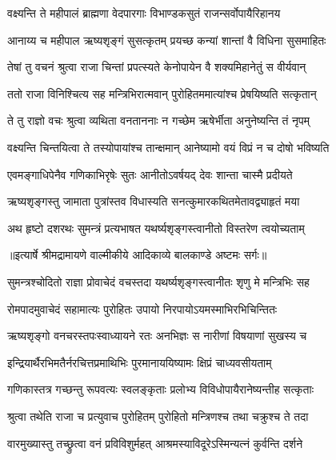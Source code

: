 \twolineshloka
{वक्ष्यन्ति ते महीपालं ब्राह्मणा वेदपारगाः}
{विभाण्डकसुतं राजन्सर्वोपायैरिहानय} %

\twolineshloka
{आनाय्य च महीपाल ऋष्यशृङ्गं सुसत्कृतम्}
{प्रयच्छ कन्यां शान्तां वै विधिना सुसमाहितः} %

\twolineshloka
{तेषां तु वचनं श्रुत्वा राजा चिन्तां प्रपत्स्यते}
{केनोपायेन वै शक्यमिहानेतुं स वीर्यवान्} %

\twolineshloka
{ततो राजा विनिश्चित्य सह मन्त्रिभिरात्मवान्}
{पुरोहितममात्यांश्च प्रेषयिष्यति सत्कृतान्} %

\twolineshloka
{ते तु राज्ञो वचः श्रुत्वा व्यथिता वनताननाः}
{न गच्छेम ऋषेर्भीता अनुनेष्यन्ति तं नृपम्} %

\twolineshloka
{वक्ष्यन्ति चिन्तयित्वा ते तस्योपायांश्च तान्क्षमान्}
{आनेष्यामो वयं विप्रं न च दोषो भविष्यति} %

\twolineshloka
{एवमङ्गाधिपेनैव गणिकाभिरृषेः सुतः}
{आनीतोऽवर्षयद् देवः शान्ता चास्मै प्रदीयते} %

\twolineshloka
{ऋष्यशृङ्गस्तु जामाता पुत्रांस्तव विधास्यति}
{सनत्कुमारकथितमेतावद्व्याहृतं मया} %

\twolineshloka
{अथ हृष्टो दशरथः सुमन्त्रं प्रत्यभाषत}
{यथर्ष्यशृङ्गस्त्वानीतो विस्तरेण त्वयोच्यताम्} %


{॥इत्यार्षे श्रीमद्रामायणे वाल्मीकीये आदिकाव्ये बालकाण्डे अष्टमः सर्गः॥}


\twolineshloka
{सुमन्त्रश्चोदितो राज्ञा प्रोवाचेदं वचस्तदा}
{यथर्ष्यशृङ्गस्त्वानीतः शृणु मे मन्त्रिभिः सह} %

\twolineshloka
{रोमपादमुवाचेदं सहामात्यः पुरोहितः}
{उपायो निरपायोऽयमस्माभिरभिचिन्तितः} %

\twolineshloka
{ऋष्यशृङ्गो वनचरस्तपःस्वाध्यायने रतः}
{अनभिज्ञः स नारीणां विषयाणां सुखस्य च} %

\twolineshloka
{इन्द्रियार्थैरभिमतैर्नरचित्तप्रमाथिभिः}
{पुरमानाययिष्यामः क्षिप्रं चाध्यवसीयताम्} %

\twolineshloka
{गणिकास्तत्र गच्छन्तु रूपवत्यः स्वलङ्कृताः}
{प्रलोभ्य विविधोपायैरानेष्यन्तीह सत्कृताः} %

\twolineshloka
{श्रुत्वा तथेति राजा च प्रत्युवाच पुरोहितम्}
{पुरोहितो मन्त्रिणश्च तथा चक्रुश्च ते तदा} %

\twolineshloka
{वारमुख्यास्तु तच्छ्रुत्वा वनं प्रविविशुर्महत्}
{आश्रमस्याविदूरेऽस्मिन्यत्नं कुर्वन्ति दर्शने} %

